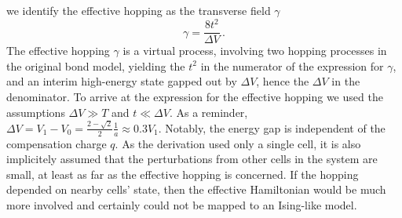 %
we identify the effective hopping as the transverse field $\gamma$
%
\begin{equation}
  \gamma = \frac{8 t^2}{\Delta V} \, .
\end{equation}
%
The effective hopping $\gamma$ is a virtual process, involving two hopping
processes in the original bond model, yielding the $t^2$ in the numerator of the
expression for $\gamma$, and an interim high-energy state gapped out by $\Delta
V$, hence the $\Delta V$ in the denominator. To arrive at the expression for the
effective hopping we used the assumptions $\Delta V \gg T$ and $t \ll \Delta V$.
As a reminder, $\Delta V = V_1 - V_0 = \frac{2 - \sqrt{2}}{2} \frac{1}{a}
\approx 0.3 V_1$. Notably, the energy gap is independent of the compensation
charge $q$. As the derivation used only a single cell, it is also implicitely
assumed that the perturbations from other cells in the system are small, at
least as far as the effective hopping is concerned. If the hopping depended on
nearby cells' state, then the effective Hamiltonian would be much more involved
and certainly could not be mapped to an Ising-like model.

